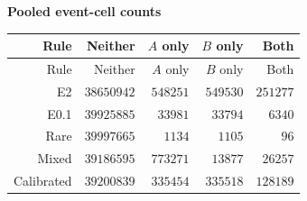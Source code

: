 
\begingroup\small
\setlength{\tabcolsep}{4pt}
\noindent\textbf{Pooled event-cell counts}
\begin{longtable}{rrrrr}
\toprule
Rule & Neither & $A$ only & $B$ only & Both \\
\midrule
\endfirsthead
Rule & Neither & $A$ only & $B$ only & Both \\
\midrule
\endhead
\bottomrule
\endfoot
E2 & $38650942$ & $548251$ & $549530$ & $251277$ \\
E0.1 & $39925885$ & $33981$ & $33794$ & $6340$ \\
Rare & $39997665$ & $1134$ & $1105$ & $96$ \\
Mixed & $39186595$ & $773271$ & $13877$ & $26257$ \\
Calibrated & $39200839$ & $335454$ & $335518$ & $128189$ \\
\end{longtable}
\endgroup



